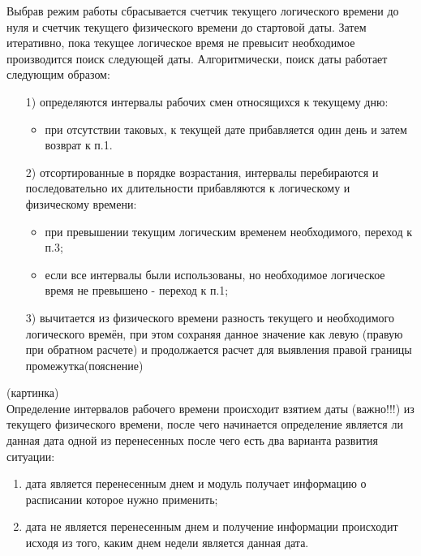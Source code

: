 \indent Выбрав режим работы сбрасывается счетчик текущего логического времени до нуля и счетчик текущего физического времени до стартовой даты. Затем итеративно, пока текущее логическое время не превысит необходимое производится поиск следующей даты.
Алгоритмически, поиск даты работает следующим образом:
\begin{enumerate}
	\item[1)] определяются интервалы рабочих смен относящихся к текущему дню:
	      \begin{itemize}
		      \item при отсутствии таковых, к текущей дате прибавляется один день и затем возврат к п.1.
	      \end{itemize}
	\item[2)] отсортированные в порядке возрастания, интервалы перебираются и последовательно их длительности прибавляются к логическому и физическому времени:
	      \begin{itemize}
		      \item при превышении текущим логическим временем необходимого, переход к п.3;
		      \item если все интервалы были использованы, но необходимое логическое время не превышено - переход к п.1;
	      \end{itemize}
	\item[3)] вычитается из физического времени разность текущего и необходимого логического времён, при этом сохраняя данное значение как левую (правую при обратном расчете) и продолжается расчет для выявления правой границы промежутка(пояснение)
\end{enumerate}
(картинка)\\
\indent Определение интервалов рабочего времени происходит взятием даты (важно!!!) из текущего физического времени, после чего начинается определение является ли данная дата одной из перенесенных после чего есть два варианта развития ситуации:
\begin{enumerate}
	\item дата является перенесенным днем и модуль получает информацию о расписании которое нужно применить;
	\item дата не является перенесенным днем и получение информации происходит исходя из того, каким днем недели является данная дата.
\end{enumerate}





